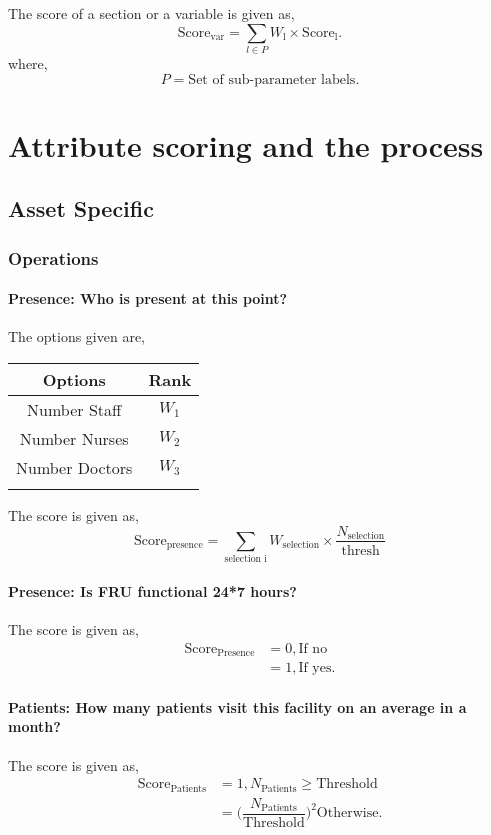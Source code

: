 \documentclass[oneside]{article}
\newcommand{\tsub}[2]{\text{#1}_{\text{#2}}}
\newcommand{\tsubb}[2]{#1_{\text{#2}}}
\newenvironment{ttable}
{
\begin{center}
\begin{tabular}{c|c}
\hline
}
{
\\ \hline
\end{tabular}
\end{center}
}
\begin{document}
The score of a section or a variable is given as,
\[
	\tsub{Score}{var} = \sum_{l \in P} \tsubb{W}{l} \times \tsub{Score}{l}.
\]
where,
\[
	P = \text{Set of sub-parameter labels.}
\]
\section{Attribute scoring and the
process}
\subsection{Asset Specific}
\subsubsection{Operations}

\paragraph{Presence: Who is present at this point?}

The options given are,
\begin{ttable}
Options & Rank \\ \hline
Number Staff & $W_1$ \\
Number Nurses & $W_2$ \\
Number Doctors & $W_3$ \\
\hline
\end{ttable}
The score is given as,
\[
	\tsub{Score}{presence} = \sum_{\text{selection i}} \tsubb{W}{selection} \times \dfrac{\tsubb{N}{selection}}{\text{thresh}}
\]

\paragraph{Presence: Is FRU functional 24*7 hours?}

The score is given as,
\begin{align*}
\tsub{Score}{Presence} &= 0, \text{If no} \\
        &= 1, \text{If yes}.
\end{align*}
\paragraph{Patients: How many patients visit this facility on an average in a month?}

The score is given as,
\begin{align*}
\tsub{Score}{Patients} &= 1, \tsubb{N}{Patients} \ge \text{Threshold} \\
        &=
\Big(\dfrac{\tsubb{N}{Patients}}{\text{Threshold}}\Big)^{2}
\text{Otherwise}.
\end{align*}
\end{document}
